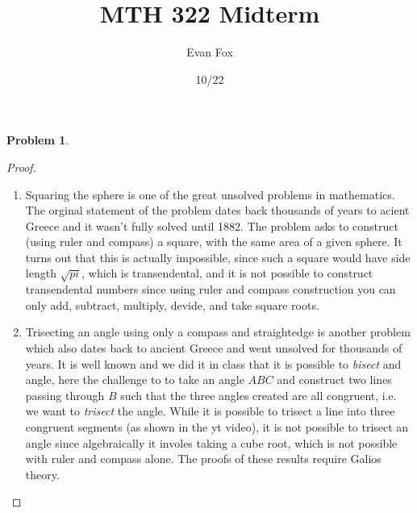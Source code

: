 \documentclass{article}
\title{MTH 322 Midterm }
\author{Evan Fox}
\date{10/22}
\newtheorem{prb}{Problem}
\begin{document}
\maketitle
	   \begin{prb}  \end{prb} 
	   \begin{proof} 
	   	\begin{enumerate}
	   		\item Squaring the sphere is one of the great unsolved problems in mathematics. 
				The orginal statement of the problem dates back thousands of years
				to acient Greece and it wasn't 
				fully solved until 1882. The problem asks to construct (using ruler and compass) 
				a square, with the same area of a given sphere. It turns out that this is actually 
				impossible, since such a square would have side length $\sqrt{pi}$, which is 
				transendental, and it is not possible to construct transendental numbers since 
				using ruler and compass construction you can only add, subtract, multiply, devide, 
				and take square roots. 


			\item Trisecting an angle using only a compass and straightedge is another problem 
				which also dates back to ancient Greece and went unsolved for thousands 
				of years. It is 
				well known and we did it in class that 
				it is possible to \emph{bisect} and angle, 
				here the challenge to to take an angle $ABC$ and construct two
				lines passing through $B$ such that the three angles created are all congruent, i.e. 
				we want to \emph{trisect} the angle. While it is possible to trisect a line 
				into three congruent segments (as shown in the yt video), it is not 
				possible to trisect an angle since algebraically it involes taking a 
				cube root, which is not possible with ruler and compass alone. The proofs 
				of these results require Galios theory. 

		\end{enumerate}
	   \end{proof}  
\end{document}
